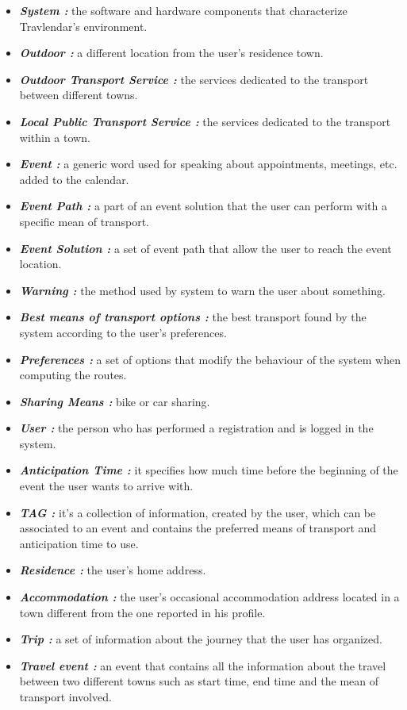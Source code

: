 \newpage
{}
\begin{itemize}
	\setlength{\leftskip}{0.5cm}
	\item \emph{\textbf{System : }}the software and hardware components that characterize Travlendar’s environment.
	\item \emph{\textbf{Outdoor : }}a different location from the user’s residence town.
	\item \emph{\textbf{Outdoor Transport Service : }}the services dedicated to the transport between different towns.
	\item \emph{\textbf{Local Public Transport Service : }}the services dedicated to the transport within a town.
	\item \emph{\textbf{Event : }}a generic word used for speaking about appointments, meetings, etc. added to the calendar.
	\item \emph{\textbf{Event Path : }}a part of an event solution that the user can perform with a specific mean of transport.
	\item \emph{\textbf{Event Solution : }}a set of event path that allow the user to reach the event location.
	\item \emph{\textbf{Warning : }}the method used by system to warn the user about something.
	\item \emph{\textbf{Best means of transport options : }}the best transport found by the system according to the user’s preferences.
	\item \emph{\textbf{Preferences : }}a set of options that modify the behaviour of the system when computing the routes.
	\item \emph{\textbf{Sharing Means : }}bike or car sharing.
	\item \emph{\textbf{User : }}the person who has performed a registration and is logged in the system.
	\item \emph{\textbf{Anticipation Time : }}it specifies how much time before the beginning of the event the user wants to arrive with.
	\item \emph{\textbf{TAG : }}it’s a collection of information, created by the user, which can be associated to an event and contains the preferred means of transport and anticipation time to use.
	\item \emph{\textbf{Residence : }}the user’s home address.
	\item \emph{\textbf{Accommodation : }}the user’s occasional accommodation address located in a town different from the one reported in his profile.
	\item \emph{\textbf{Trip : }}a set of information about the journey that the user has organized.
	\item \emph{\textbf{Travel event : }}an event that contains all the information about the travel between two different towns such as start time, end time and the mean of transport involved.
\end{itemize}

